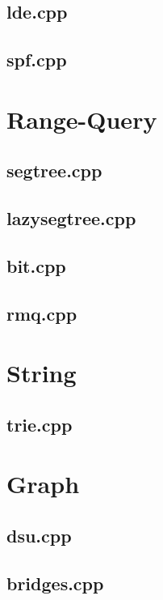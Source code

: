 \documentclass[a4paper, twocolumn]{article}
\begin{document}
\subsection{lde.cpp}

\subsection{spf.cpp}



\section{Range-Query}
\subsection{segtree.cpp}

\subsection{lazysegtree.cpp}

\subsection{bit.cpp}

\subsection{rmq.cpp}



\section{String}
\subsection{trie.cpp}



\section{Graph}
\subsection{dsu.cpp}

\subsection{bridges.cpp}

\end{document}
